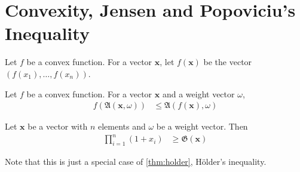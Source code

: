 \documentclass{subfile}
\begin{document}
	\section{Convexity, Jensen and Popoviciu's Inequality}\label{sec:convexity}
	
	Let $f$ be a convex function. For a vector $\mathbf{x}$, let $f(\mathbf{x})$ be the vector $(f(x_{1}),\ldots,f(x_{n}))$.
		\begin{theorem}
			Let $f$ be a convex function. For a vector $\mathbf{x}$ and a weight vector $\omega$,
				\begin{align*}
					f\left(\mathfrak{A}(\mathbf{x},\omega)\right)
						& \leq \mathfrak{A}(f(\mathbf{x}),\omega)
				\end{align*}
		\end{theorem}
	
		\begin{theorem}
			Let $\mathbf{x}$ be a vector with $n$ elements and $\omega$ be a weight vector. Then
				\begin{align*}
					\prod_{i=1}^{n}(1+x_{i})
						& \geq \mathfrak{G}(\mathbf{x})
				\end{align*}
		\end{theorem}
	Note that this is just a special case of \autoref{thm:holder}, H\"{o}lder's inequality.
\end{document}
